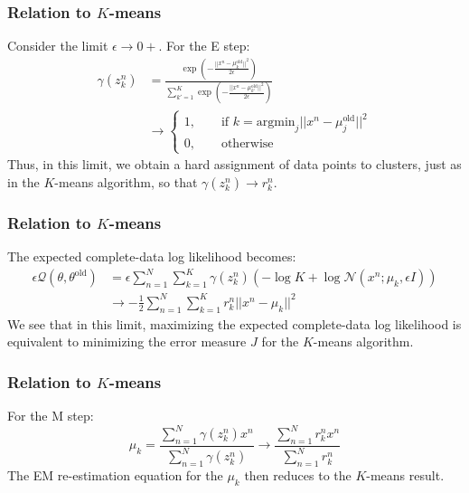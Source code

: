 \documentclass{beamer}
\begin{document}
\begin{frame}
    \frametitle{Relation to $K$-means}
    Consider the limit $\epsilon\to{}0+$. For the E step:
    \begin{align*}
        \gamma(z^{n}_{k})&=\frac{\exp(-\frac{||x^{n}-\mu_{k}^{\textrm{old}}||^{2}}{2\epsilon})}{\sum_{k'=1}^{K}\exp(-\frac{||x^{n}-\mu_{k'}^{\textrm{old}}||^{2}}{2\epsilon})} \\
        &\to\begin{cases}
            1,\qquad\textrm{if }k=\mathrm{argmin}_{j}||x^{n}-\mu_{j}^{\textrm{old}}||^{2} \\
            0,\qquad\textrm{otherwise}
        \end{cases}
    \end{align*}
    Thus, in this limit, we obtain a hard assignment of data points to clusters, just as in the $K$-means algorithm, so that $\gamma(z^{n}_{k})\to{}r^{n}_{k}$.
\end{frame}

\begin{frame}
    \frametitle{Relation to $K$-means}
    The expected complete-data log likelihood becomes:
    \begin{align*}
        \epsilon\mathcal{Q}(\theta,\theta^{\textrm{old}})&=\epsilon\sum_{n=1}^{N}\sum_{k=1}^{K}\gamma(z^{n}_{k})(-\log{K}+\log\mathcal{N}(x^{n};\mu_{k},\epsilon{}I)) \\
        &\to-\frac{1}{2}\sum_{n=1}^{N}\sum_{k=1}^{K}r^{n}_{k}||x^{n}-\mu_{k}||^{2}
    \end{align*}
    We see that in this limit, maximizing the expected complete-data log likelihood is equivalent to minimizing the error measure $J$ for the $K$-means algorithm.
\end{frame}

\begin{frame}
    \frametitle{Relation to $K$-means}
    For the M step:
    \begin{equation*}
        \mu_{k}=\frac{\sum_{n=1}^{N}\gamma(z^{n}_{k})x^{n}}{\sum_{n=1}^{N}\gamma(z^{n}_{k})}\to\frac{\sum_{n=1}^{N}r^{n}_{k}x^{n}}{\sum_{n=1}^{N}r^{n}_{k}}
    \end{equation*}
    The EM re-estimation equation for the $\mu_{k}$ then reduces to the $K$-means result.
\end{frame}
\end{document}
